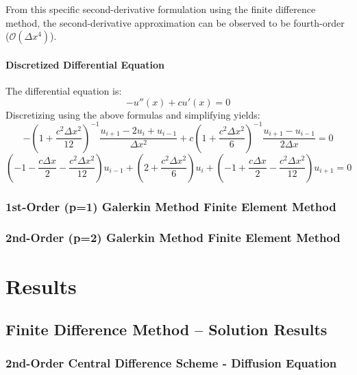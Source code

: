 \documentclass[10pt]{article}		%
\numberwithin{equation}{section}
\begin{document}
From this specific second-derivative formulation using the finite difference method, the second-derivative approximation can be observed to be fourth-order ($\mathcal{O}(\Delta x^4)$).

\paragraph{Discretized Differential Equation}
The differential equation is:
\begin{equation}
- u''(x)+cu'(x)=0
\end{equation}
Discretizing using the above formulas and simplifying yields:
\begin{equation}
-\left(1 + \frac{c^2\Delta x^2}{12} \right)^{-1} \frac{u_{i+1} -2u_i + u_{i-1}}{\Delta x^2} + c\left(1 + \frac{c^2\Delta x^2}{6}\right)^{-1} \frac{u_{i+1} - u_{i-1}}{2\Delta x} = 0
\end{equation}
\begin{equation}
\left(-1-\frac{c\Delta x}{2}-\frac{c^2\Delta x^2}{12}\right)u_{i-1} + \left(2+\frac{c^2\Delta x^2}{6}\right)u_{i} + \left(-1+\frac{c\Delta x}{2}-\frac{c^2\Delta x^2}{12}\right)u_{i+1} = 0
\end{equation}

\subsubsection{1st-Order (p=1) Galerkin Method Finite Element Method}

\subsubsection{2nd-Order (p=2) Galerkin Method Finite Element Method}

\newpage

\section{Results}

\subsection{Finite Difference Method -- Solution Results}

\subsubsection{2nd-Order Central Difference Scheme - Diffusion Equation}
\end{document}
